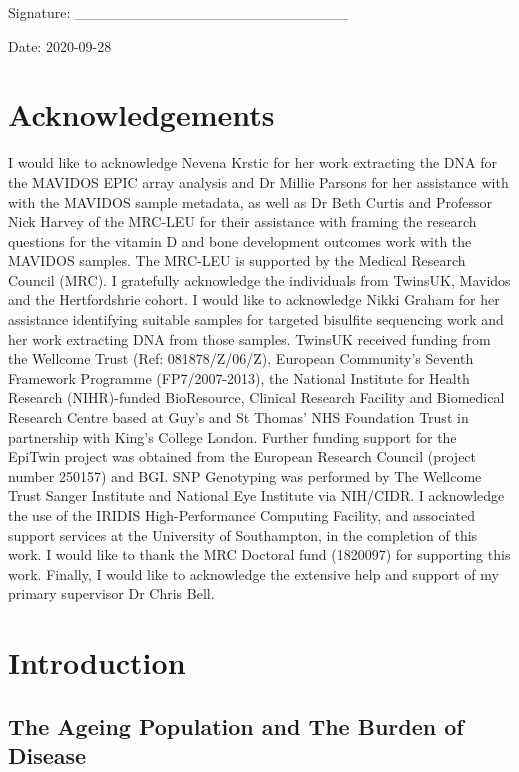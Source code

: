 \documentclass[
]{book}
\begin{document}
Signature: \_\_\_\_\_\_\_\_\_\_\_\_\_\_\_\_\_\_\_\_\_\_\_\_\_\_

Date: 2020-09-28

\newpage

\hypertarget{acknowledgements}{%
\chapter*{Acknowledgements}\label{acknowledgements}}

I would like to acknowledge Nevena Krstic for her work extracting the DNA for the MAVIDOS EPIC array analysis and Dr Millie Parsons for her assistance with with the MAVIDOS sample metadata, as well as Dr Beth Curtis and Professor Nick Harvey of the MRC-LEU for their assistance with framing the research questions for the vitamin D and bone development outcomes work with the MAVIDOS samples.
The MRC-LEU is supported by the Medical Research Council (MRC).
I gratefully acknowledge the individuals from TwinsUK, Mavidos and the Hertfordshrie cohort.
I would like to acknowledge Nikki Graham for her assistance identifying suitable samples for targeted bisulfite sequencing work and her work extracting DNA from those samples.
TwinsUK received funding from the Wellcome Trust (Ref: 081878/Z/06/Z), European Community's Seventh Framework Programme (FP7/2007-2013), the National Institute for Health Research (NIHR)-funded BioResource, Clinical Research Facility and Biomedical Research Centre based at Guy's and St Thomas' NHS Foundation Trust in partnership with King's College London.
Further funding support for the EpiTwin project was obtained from the European Research Council (project number 250157) and BGI.
SNP Genotyping was performed by The Wellcome Trust Sanger Institute and National Eye Institute via NIH/CIDR.
I acknowledge the use of the IRIDIS High-Performance Computing Facility, and associated support services at the University of Southampton, in the completion of this work.
I would like to thank the MRC Doctoral fund (1820097) for supporting this work.
Finally, I would like to acknowledge the extensive help and support of my primary supervisor Dr Chris Bell.

\hypertarget{introduction}{%
\chapter{Introduction}\label{introduction}}

\hypertarget{the-ageing-population-and-the-burden-of-disease}{%
\section{The Ageing Population and The Burden of Disease}\label{the-ageing-population-and-the-burden-of-disease}}
\end{document}
